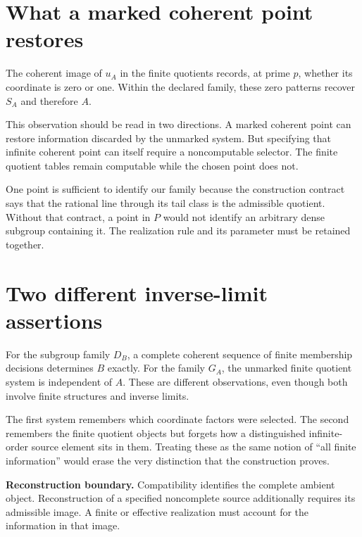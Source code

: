 \section{What a marked coherent point restores}
The coherent image of $u_A$ in the finite quotients records, at prime $p$, whether its coordinate is zero or one. Within the declared family, these zero patterns recover $S_A$ and therefore $A$.

This observation should be read in two directions. A marked coherent point can restore information discarded by the unmarked system. But specifying that infinite coherent point can itself require a noncomputable selector. The finite quotient tables remain computable while the chosen point does not.

One point is sufficient to identify our family because the construction contract says that the rational line through its tail class is the admissible quotient. Without that contract, a point in $P$ would not identify an arbitrary dense subgroup containing it. The realization rule and its parameter must be retained together.

\section{Two different inverse-limit assertions}
For the subgroup family $D_B$, a complete coherent sequence of finite membership decisions determines $B$ exactly. For the family $G_A$, the unmarked finite quotient system is independent of $A$. These are different observations, even though both involve finite structures and inverse limits.

The first system remembers which coordinate factors were selected. The second remembers the finite quotient objects but forgets how a distinguished infinite-order source element sits in them. Treating these as the same notion of ``all finite information'' would erase the very distinction that the construction proves.

\begin{keybox}
\textbf{Reconstruction boundary.} Compatibility identifies the complete ambient object. Reconstruction of a specified noncomplete source additionally requires its admissible image. A finite or effective realization must account for the information in that image.
\end{keybox}
